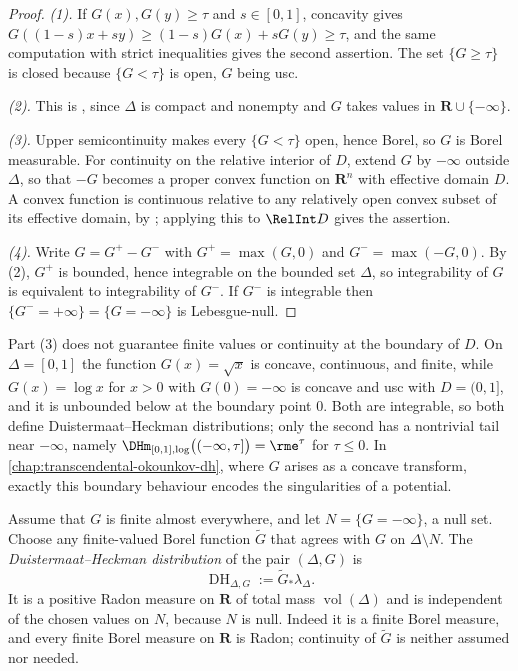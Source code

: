 \begin{proof}
\emph{(1).}  If $G(x),G(y)\geq\tau$ and $s\in[0,1]$, concavity gives
$G((1-s)x+sy)\geq(1-s)G(x)+sG(y)\geq\tau$, and the same computation with
strict inequalities gives the second assertion.  The set $\{G\geq\tau\}$ is
closed because $\{G<\tau\}$ is open, $G$ being usc.

\emph{(2).}  This is , since $\Delta$ is compact and
nonempty and $G$ takes values in $\mathbf R\cup\{-\infty\}$.

\emph{(3).}  Upper semicontinuity makes every $\{G<\tau\}$ open, hence Borel,
so $G$ is Borel measurable.  For continuity on the relative interior of $D$,
extend $G$ by $-\infty$ outside $\Delta$, so that $-G$ becomes a proper convex
function on $\mathbf R^n$ with effective domain $D$.  A convex function is
continuous relative to any relatively open convex subset of its effective
domain, by \cite[Theorem~10.1]{Roc70}; applying this to $\RelInt D$ gives the
assertion.

\emph{(4).}  Write $G=G^+-G^-$ with $G^+=\max(G,0)$ and $G^-=\max(-G,0)$.
By (2), $G^+$ is bounded, hence integrable on the bounded set $\Delta$, so
integrability of $G$ is equivalent to integrability of $G^-$.  If $G^-$ is
integrable then $\{G^-=+\infty\}=\{G=-\infty\}$ is Lebesgue-null.
\end{proof}

\begin{remark}
\label{rem:concave-boundary}
Part (3) does not guarantee finite values or continuity at the boundary of
$D$.  On
$\Delta=[0,1]$ the function $G(x)=\sqrt{x}$ is concave, continuous, and
finite, while $G(x)=\log x$ for $x>0$ with $G(0)=-\infty$ is concave and usc
with $D=(0,1]$, and it is unbounded below at the boundary point $0$.  Both are
integrable, so both define Duistermaat--Heckman distributions; only the second
has a nontrivial tail near $-\infty$, namely
$\DHm_{[0,1],\log}\bigl((-\infty,\tau]\bigr)=\rme^{\tau}$ for $\tau\leq0$.  In
\cref{chap:transcendental-okounkov-dh}, where $G$ arises as a concave
transform, exactly this boundary behaviour encodes the singularities of a
potential.
\end{remark}

\begin{definition}
\label{def:dh-distribution}
Assume that $G$ is finite almost everywhere, and let
$N=\{G=-\infty\}$, a null set.  Choose any finite-valued Borel function
$\widetilde G$ that agrees with $G$ on $\Delta\setminus N$.  The
\emph{Duistermaat--Heckman distribution} of the pair $(\Delta,G)$ is
\[
                        \operatorname{DH}_{\Delta,G}
                        :=\widetilde G_*\lambda_\Delta.
\]
It is a positive Radon measure on $\mathbf R$ of total mass
$\operatorname{vol}(\Delta)$ and is independent of the chosen values on
$N$, because $N$ is null.  Indeed it is a finite Borel measure, and every
finite Borel measure on $\mathbf R$ is Radon; continuity of $\widetilde G$ is
neither assumed nor needed.
\end{definition}

